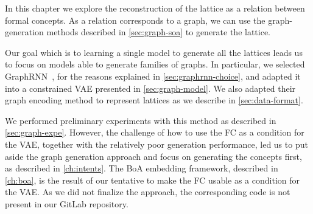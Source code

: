 In this chapter we explore the reconstruction of the lattice as a relation between formal concepts.
As a relation corresponds to a graph, we can use the \soa{} graph-generation methods described in \cref{sec:graph-soa} to generate the lattice.

Our goal which is to learning a single model to generate all the lattices leads us to focus on models able to generate families of graphs. In particular, we selected GraphRNN~\cite{graphrnn:2018:jiaxuan}, for the reasons explained in \cref{sec:graphrnn-choice}, and adapted it into a constrained VAE presented in \cref{sec:graph-model}. We also adapted their graph encoding method to represent lattices as we describe in \cref{sec:data-format}.

We performed preliminary experiments with this method as described in \cref{sec:graph-expe}.
However, the challenge of how to use the FC as a condition for the VAE, together with the relatively poor generation performance, led us to put aside the graph generation approach and focus on generating the concepts first, as described in \cref{ch:intents}.
The BoA embedding framework, described in \cref{ch:boa}, is the result of our tentative to make the FC usable as a condition for the VAE.
As we did not finalize the approach, the corresponding code is not present in our GitLab repository.%